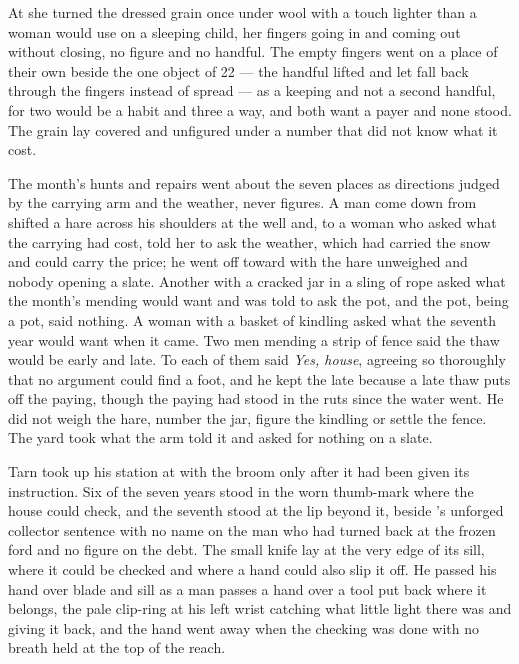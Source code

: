 At  she turned the dressed grain once under wool with a touch lighter than a woman would use on a sleeping child, her fingers going in and coming out without closing, no figure and no handful. The empty fingers went on a place of their own beside the one object of  22 --- the handful lifted and let fall back through the fingers instead of spread --- as a keeping and not a second handful, for two would be a habit and three a way, and both want a payer and none stood. The grain lay covered and unfigured under a number that did not know what it cost.

\scenebreak

The month's hunts and repairs went about the seven places as directions judged by the carrying arm and the weather, never figures. A man come down from  shifted a hare across his shoulders at the well and, to a woman who asked what the carrying had cost, told her to ask the weather, which had carried the snow and could carry the price; he went off toward  with the hare unweighed and nobody opening a slate. Another with a cracked jar in a sling of rope asked what the month's mending would want and was told to ask the pot, and the pot, being a pot, said nothing. A woman with a basket of kindling asked what the seventh year would want when it came. Two men mending a strip of fence said the thaw would be early and late. To each of them  said \emph{Yes, house}, agreeing so thoroughly that no argument could find a foot, and he kept the late because a late thaw puts off the paying, though the paying had stood in the ruts since the water went. He did not weigh the hare, number the jar, figure the kindling or settle the fence. The yard took what the arm told it and asked for nothing on a slate.

Tarn took up his station at  with the broom only after it had been given its instruction. Six of the seven years stood in the worn thumb-mark where the house could check, and the seventh stood at the lip beyond it, beside 's unforged collector sentence with no name on the man who had turned back at the frozen ford and no figure on the debt. The small knife lay at the very edge of its sill, where it could be checked and where a hand could also slip it off. He passed his hand over blade and sill as a man passes a hand over a tool put back where it belongs, the pale clip-ring at his left wrist catching what little light there was and giving it back, and the hand went away when the checking was done with no breath held at the top of the reach.

